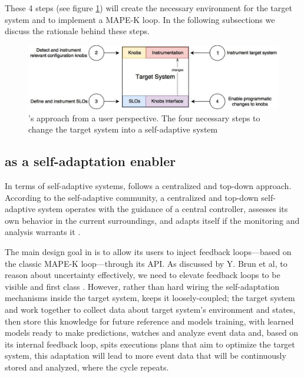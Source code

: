 These 4 steps (see figure \ref{fig:finch1}) will create the necessary environment for the target system and \projectname{} to implement a MAPE-K loop. In the following subsections we discuss the rationale behind these steps. 

\begin{figure}[t]
  \includegraphics[width=\textwidth]{images/finch_user_perspective.jpg}
  \caption{\projectname{}'s approach from a user perspective. The four necessary steps to change the target system into a self-adaptive system}
  \label{fig:finch1}
\end{figure}

\subsection{\projectname{} as a self-adaptation enabler}

In terms of self-adaptive systems, \projectname{} follows a centralized and top-down approach. According to the self-adaptive community, a centralized and top-down self-adaptive system operates with the guidance of a central controller, assesses its own behavior in the current surroundings, and adapts itself if the monitoring and analysis warrants it \cite{brun_engineering_2009}.

The main design goal in \projectname{} is to allow its users to inject feedback loops---based on the classic MAPE-K loop---through its API. As discussed by Y. Brun et al, to reason about uncertainty effectively, we need to elevate feedback loops to be visible and first class \cite{brun_engineering_2009}. However, rather than hard wiring the self-adaptation mechanisms inside the target system, \projectname{} keeps it loosely-coupled; the target system and \projectname{} work together to collect data about target system's environment and states, then \projectname{} store this knowledge for future reference and models training, with learned models ready to make predictions, \projectname{} watches and analyze event data and, based on its internal feedback loop, spits executions plans that aim to optimize the target system, this adaptation will lead to more event data that will be continuously stored and analyzed, where the cycle repeats.


